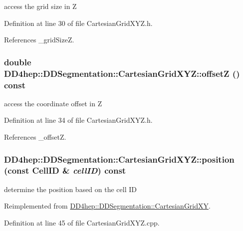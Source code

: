 access the grid size in Z 

Definition at line 30 of file CartesianGridXYZ.h.

References \_\-gridSizeZ.\hypertarget{class_d_d4hep_1_1_d_d_segmentation_1_1_cartesian_grid_x_y_z_a747dfb49d7ca0ee30c04f5f4229b1972}{
\subsubsection[{offsetZ}]{\setlength{\rightskip}{0pt plus 5cm}double DD4hep::DDSegmentation::CartesianGridXYZ::offsetZ () const}}
\label{class_d_d4hep_1_1_d_d_segmentation_1_1_cartesian_grid_x_y_z_a747dfb49d7ca0ee30c04f5f4229b1972}


access the coordinate offset in Z 

Definition at line 34 of file CartesianGridXYZ.h.

References \_\-offsetZ.\hypertarget{class_d_d4hep_1_1_d_d_segmentation_1_1_cartesian_grid_x_y_z_a029a72904042397250b67948270884ac}{
\subsubsection[{position}]{ DD4hep::DDSegmentation::CartesianGridXYZ::position (const {\bf CellID} \& {\em cellID}) const}}
\label{class_d_d4hep_1_1_d_d_segmentation_1_1_cartesian_grid_x_y_z_a029a72904042397250b67948270884ac}


determine the position based on the cell ID 

Reimplemented from \hyperlink{class_d_d4hep_1_1_d_d_segmentation_1_1_cartesian_grid_x_y_a2a7d50d0a59d37116654b0f6a691f945}{DD4hep::DDSegmentation::CartesianGridXY}.

Definition at line 45 of file CartesianGridXYZ.cpp.

